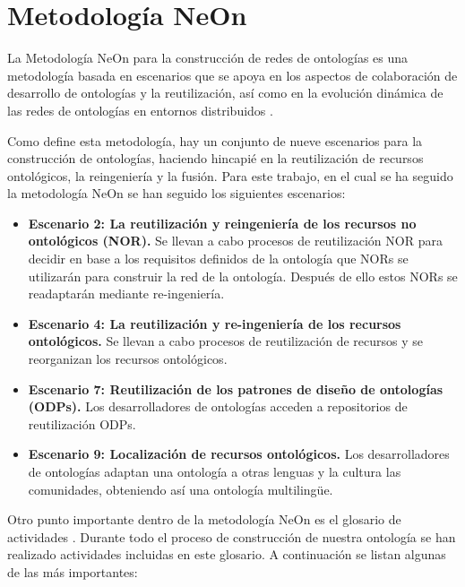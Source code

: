 \documentclass[a4paper,12pt]{article}
\begin{document}
	\section{Metodología NeOn}
	
	La Metodología NeOn para la construcción de redes de ontologías es una metodología basada en
	escenarios que se apoya en los aspectos de colaboración de desarrollo de ontologías y la
	reutilización, así como en la evolución dinámica de las redes de ontologías en entornos
	distribuidos
\cite{oeg-neon}.
	
	Como define esta metodología, hay un conjunto de nueve escenarios para la construcción de
	ontologías, haciendo hincapié en la reutilización de recursos ontológicos, la reingeniería y la
	fusión. Para este trabajo, en el cual se ha seguido la metodología NeOn se han seguido los
	siguientes escenarios:
	\begin{itemize}
		\item \textbf{Escenario 2: La reutilización y reingeniería de los recursos no ontológicos (NOR).}
		Se llevan a cabo procesos de reutilización NOR para decidir en base a los requisitos
definidos de la ontología que NORs se utilizarán para construir la red de la ontología.
Después de ello estos NORs se readaptarán mediante re-ingeniería.
		\item \textbf{Escenario 4: La reutilización y re-ingeniería de los recursos ontológicos.} 
		Se llevan a cabo procesos de reutilización de recursos y se reorganizan los recursos ontológicos.
		\item \textbf{Escenario 7: Reutilización de los patrones de diseño de ontologías (ODPs).}
		Los
desarrolladores de ontologías acceden a repositorios de reutilización ODPs.
		\item \textbf{Escenario 9: Localización de recursos ontológicos.}
		Los desarrolladores de ontologías
adaptan una ontología a otras lenguas y la cultura las comunidades, obteniendo así una
ontología multilingüe.
	\end{itemize}
	
	Otro punto importante dentro de la metodología NeOn es el glosario de actividades \cite{oeg-glossary}. Durante todo el proceso de construcción de
nuestra ontología se han realizado actividades incluidas en este glosario. A continuación se listan
algunas de las más importantes:
	
\end{document}
